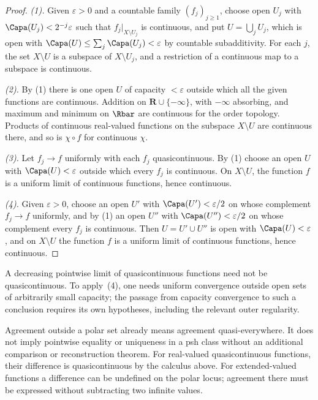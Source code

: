\begin{proof}
\emph{(1).}  Given $\varepsilon>0$ and a countable family $(f_j)_{j\geq1}$,
choose open $U_j$ with $\Capa(U_j)<2^{-j}\varepsilon$ such that
$f_j|_{X\setminus U_j}$ is continuous, and put $U=\bigcup_jU_j$, which is open
with $\Capa(U)\leq\sum_j\Capa(U_j)<\varepsilon$ by countable subadditivity.
For each $j$, the set $X\setminus U$ is a subspace of $X\setminus U_j$, and a
restriction of a continuous map to a subspace is continuous.

\emph{(2).}  By (1) there is one open $U$ of capacity $<\varepsilon$ outside
which all the given functions are continuous.  Addition on
$\mathbf R\cup\{-\infty\}$, with $-\infty$ absorbing, and maximum and minimum
on $\Rbar$ are continuous for the order topology.  Products of continuous
real-valued functions on the subspace $X\setminus U$ are continuous there,
and so is $\chi\circ f$ for continuous $\chi$.

\emph{(3).}  Let $f_j\to f$ uniformly with each $f_j$ quasicontinuous.  By (1)
choose an open $U$ with $\Capa(U)<\varepsilon$ outside which every $f_j$ is
continuous.  On $X\setminus U$, the function $f$ is a uniform limit of
continuous functions, hence continuous.

\emph{(4).}  Given $\varepsilon>0$, choose an open $U'$ with
$\Capa(U')<\varepsilon/2$ on whose complement $f_j\to f$ uniformly, and by (1)
an open $U''$ with $\Capa(U'')<\varepsilon/2$ on whose complement every $f_j$
is continuous.  Then $U=U'\cup U''$ is open with $\Capa(U)<\varepsilon$, and
on $X\setminus U$ the function $f$ is a uniform limit of continuous functions,
hence continuous.
\end{proof}

\begin{remark}
\label{rem:quasicontinuity-limits}
A decreasing pointwise limit of quasicontinuous functions need not be
quasicontinuous.  To apply \,(4), one
needs uniform convergence outside open sets of arbitrarily small capacity;
the passage from capacity convergence to such a conclusion requires its
own hypotheses, including the relevant outer regularity.

Agreement outside a polar set already means agreement quasi-everywhere.
It does not imply pointwise equality or uniqueness in a psh class without
an additional comparison or reconstruction theorem.  For real-valued
quasicontinuous functions, their difference is quasicontinuous by the
calculus above.  For extended-valued functions a difference can be undefined
on the polar locus; agreement there must be expressed without subtracting
two infinite values.
\end{remark}

